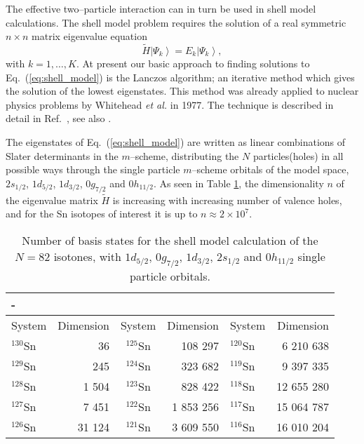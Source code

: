 The effective two--particle interaction can in turn be used in shell model
calculations.
The shell model problem requires the solution of a real symmetric
$n \times n$ matrix eigenvalue equation
\begin{equation}
       \tilde{H}\left | \Psi_k\right\rangle  = 
       E_k \left | \Psi_k\right\rangle ,
       \label{eq:shell_model}
\end{equation}
with $k = 1,\ldots, K$. 
At present our basic approach to 
finding solutions to Eq.\ (\ref{eq:shell_model})
is the Lanczos algorithm; an iterative method which gives the solution of
the lowest eigenstates. This method was 
already applied to nuclear physics problems by Whitehead {\sl et al.} 
in 1977. The technique is described in detail in Ref.\ \cite{whit77}, 
see also \cite{ehho95}. 

The eigenstates of Eq.\ (\ref{eq:shell_model}) are
written as linear combinations of Slater determinants in the $m$--scheme,
distributing the $N$ particles(holes) in all possible
ways through the single particle $m$--scheme orbitals of the 
model space,  
$2s_{1/2}$, $1d_{5/2}$, $1d_{3/2}$, $0g_{7/2}$ and $0h_{11/2}$.
As seen in Table \ref{tab:table1}, the dimensionality
$n$ of the eigenvalue matrix $\tilde{H}$ is increasing
with increasing number of valence holes, and
for the Sn isotopes of interest it is up to $n \approx 2 \times 10^{7}$.
\begin{table}[htbp]
\begin{center}
\caption{Number of basis states for the shell model calculation of the $N=82$
isotones, with $1d_{5/2}$, $0g_{7/2}$, $1d_{3/2}$, $2s_{1/2}$ and $0h_{11/2}$
single particle orbitals.}
\begin{tabular}{lrcrlr}-
\\\hline
System & Dimension & System & Dimension & System & Dimension \\
\hline
$^{130}$Sn & 36        & $^{125}$Sn & 108 297   & $^{120}$Sn & 6 210 638 \\
$^{129}$Sn  & 245       & $^{124}$Sn & 323 682   & $^{119}$Sn & 9 397 335 \\ 
$^{128}$Sn & 1 504     & $^{123}$Sn & 828 422   & $^{118}$Sn & 12 655 280 \\
$^{127}$Sn & 7 451     & $^{122}$Sn & 1 853 256 & $^{117}$Sn & 15 064 787 \\
$^{126}$Sn & 31 124    & $^{121}$Sn & 3 609 550 & $^{116}$Sn & 16 010 204 \\
\hline
\end{tabular}
\label{tab:table1}
\end{center}
\end{table}

